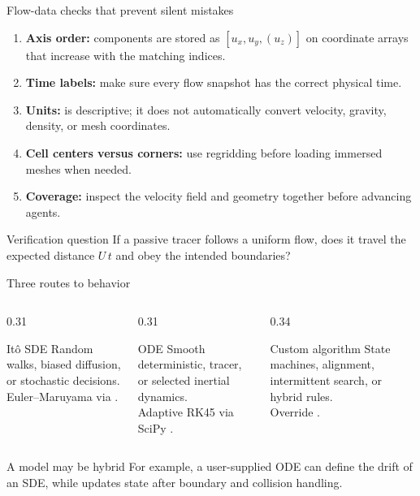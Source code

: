 \documentclass[aspectratio=169,11pt]{beamer}
\begin{document}
\begin{frame}{Flow-data checks that prevent silent mistakes}
\begin{enumerate}
  \item \textbf{Axis order:} components are stored as $[u_x,u_y,(u_z)]$ on coordinate arrays that increase with the matching indices.
  \item \textbf{Time labels:} make sure every flow snapshot has the correct physical time.
  \item \textbf{Units:}  is descriptive; it does not automatically convert velocity, gravity, density, or mesh coordinates.
  \item \textbf{Cell centers versus corners:} use regridding before loading immersed meshes when needed.
  \item \textbf{Coverage:} inspect the velocity field and geometry together before advancing agents.
\end{enumerate}
\begin{alertblock}{Verification question}
If a passive tracer follows a uniform flow, does it travel the expected distance $U\,t$ and obey the intended boundaries?
\end{alertblock}
\end{frame}

\begin{frame}{Three routes to behavior}
\begin{columns}[T,onlytextwidth]
  \begin{column}{0.31\textwidth}
    \begin{block}{It\^o SDE}
      \small Random walks, biased diffusion, or stochastic decisions.\\[3pt]
      \scriptsize Euler--Maruyama via .
    \end{block}
  \end{column}
  \begin{column}{0.31\textwidth}
    \begin{block}{ODE}
      \small Smooth deterministic, tracer, or selected inertial dynamics.\\[3pt]
      \scriptsize Adaptive RK45 via SciPy .
    \end{block}
  \end{column}
  \begin{column}{0.34\textwidth}
    \begin{block}{Custom algorithm}
      \small State machines, alignment, intermittent search, or hybrid rules.\\[3pt]
      \scriptsize Override .
    \end{block}
  \end{column}
\end{columns}
\begin{block}{A model may be hybrid}
For example, a user-supplied ODE can define the drift of an SDE, while  updates state after boundary and collision handling.
\end{block}
\end{frame}
\end{document}
